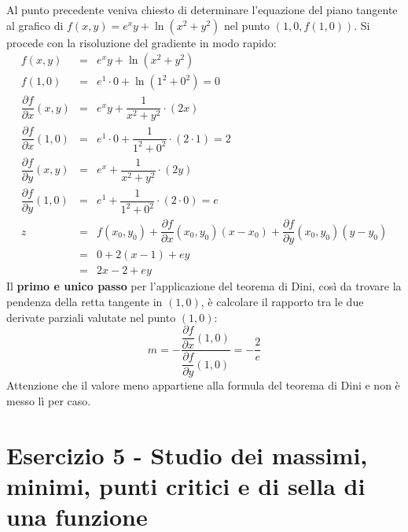 \documentclass[a4paper]{article}
\begin{document}
	\noindent
	Al punto precedente veniva chiesto di determinare l'equazione del piano tangente al grafico di $f\left(x,y\right) = e^{x}y + \ln\left(x^{2} + y^{2}\right)$ nel punto $\left(1,0,f\left(1,0\right)\right)$. Si procede con la risoluzione del gradiente in modo rapido:\
	\begin{equation*}
		\begin{array}{rcl}
			f\left(x,y\right) &=& e^{x}y + \ln\left(x^{2} + y^{2}\right) \\ [1em]
			f\left(1,0\right) &=& e^{1} \cdot 0 + \ln\left(1^{2} + 0^{2}\right) = 0 \\ [1em]
			\dfrac{\partial f}{\partial x}\left(x,y\right) &=& e^{x}y + \dfrac{1}{x^{2} + y^{2}} \cdot \left(2x\right) \\ [1.5em]
			\dfrac{\partial f}{\partial x}\left(1,0\right) &=& e^{1}\cdot 0 + \dfrac{1}{1^{2} + 0^{2}} \cdot \left(2 \cdot 1\right) = 2 \\ [2em]
			\dfrac{\partial f}{\partial y}\left(x,y\right) &=& e^{x} + \dfrac{1}{x^{2} + y^{2}} \cdot \left(2y\right) \\ [1.5em]
			\dfrac{\partial f}{\partial y}\left(1,0\right) &=& e^{1} + \dfrac{1}{1^{2} + 0^{2}} \cdot \left(2 \cdot 0\right) = e \\ [2em]
			z &=& f\left(x_{0},y_{0}\right) + \dfrac{\partial f}{\partial x}\left(x_{0}, y_{0}\right)\left(x-x_{0}\right) + \dfrac{\partial f}{\partial y}\left(x_{0}, y_{0}\right)\left(y-y_{0}\right) \\ [1em]
			&=& 0 + 2\left(x-1\right) + ey \\
			&=& 2x -2 + ey
		\end{array}
	\end{equation*}
	Il \textbf{primo e unico passo} per l'applicazione del teorema di Dini, così da trovare la pendenza della retta tangente in $\left(1,0\right)$, è calcolare il rapporto tra le due derivate parziali valutate nel punto $\left(1,0\right)$:
	\begin{equation*}
		m = - \dfrac{\dfrac{\partial f}{\partial x}\left(1,0\right)}{\dfrac{\partial f}{\partial y}\left(1,0\right)} = - \dfrac{2}{e}
	\end{equation*}
	Attenzione che il valore meno appartiene alla formula del teorema di Dini e non è messo lì per caso.\newpage

	\section{Esercizio 5 - Studio dei massimi, minimi, punti critici e di sella di una funzione}
	
\end{document}
